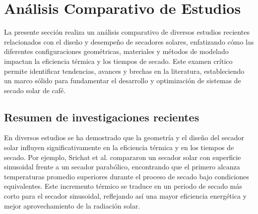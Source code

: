 \documentclass[12pt]{article}
\begin{document}

\section{Análisis Comparativo de Estudios}
La presente sección realiza un análisis comparativo de diversos estudios recientes relacionados con el diseño y desempeño de secadores solares, enfatizando cómo las diferentes configuraciones geométricas, materiales y métodos de modelado impactan la eficiencia térmica y los tiempos de secado. Este examen crítico permite identificar tendencias, avances y brechas en la literatura, estableciendo un marco sólido para fundamentar el desarrollo y optimización de sistemas de secado solar de café.




\subsection{Resumen de investigaciones recientes}
En diversos estudios se ha demostrado que la geometría y el diseño del secador solar influyen significativamente en la eficiencia térmica y en los tiempos de secado. Por ejemplo, Srichat et al. \cite{Srichat2019} compararon un secador solar con superficie sinusoidal frente a un secador parabólico, encontrando que el primero alcanza temperaturas promedio superiores durante el proceso de secado bajo condiciones equivalentes. Este incremento térmico se traduce en un periodo de secado más corto para el secador sinusoidal, reflejando así una mayor eficiencia energética y mejor aprovechamiento de la radiación solar.\\
\end{document}
